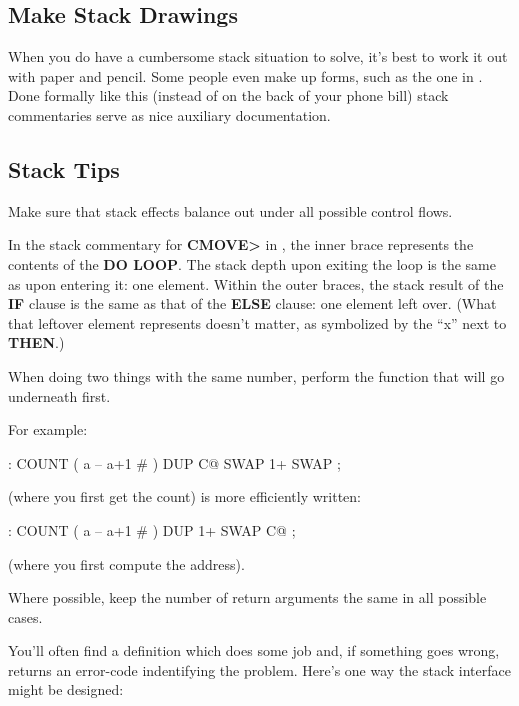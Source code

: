 \subsection{Make Stack Drawings}

When you do have a cumbersome stack situation to solve, it's best to work
it out with paper and pencil. Some people even make up forms, such as the
one in . Done formally like this (instead of on the back of your
phone bill) stack commentaries serve as nice auxiliary documentation.

\subsection{Stack Tips}

\begin{tip}
Make sure that stack effects balance out under all possible control flows.
\end{tip}
In the stack commentary for \textbf{CMOVE>} in , the inner brace
represents the contents of the \textbf{DO LOOP}. The stack depth upon exiting
the loop is the same as upon entering it: one element. Within the outer
braces, the stack result of the \textbf{IF} clause is the same as that of the
\textbf{ELSE} clause: one element left over. (What that leftover element
represents doesn't matter, as symbolized by the ``x'' next to \textbf{THEN}.)



\begin{tip}
When doing two things with the same number, perform the function that
will go underneath first.
\end{tip}
For example:

\begin{Code}
: COUNT  ( a -- a+1 # )  DUP C@  SWAP 1+  SWAP ;
\end{Code}
(where you first get the count) is more efficiently written:

\begin{Code}
: COUNT  ( a -- a+1 # )  DUP 1+  SWAP C@ ;
\end{Code}
(where you first compute the address).

\begin{tip}
Where possible, keep the number of return arguments the same in all
possible cases.
\end{tip}
You'll often find a definition which does some job and, if something goes
wrong, returns an error-code indentifying the problem. Here's one way
the stack interface might be designed:


